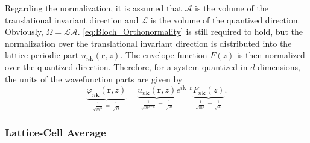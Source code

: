 Regarding the normalization, it is assumed that $\mathcal{A}$ is
the volume of the translational invariant direction and $\mathcal{L}$
is the volume of the quantized direction. Obviously, $\Omega=\mathcal{LA}$.
\ref{eq:Bloch_Orthonormality} is still required to hold, but the
normalization over the translational invariant direction is distributed
into the lattice periodic part $u_{n\mathbf{k}}(\mathbf{r},z)$. The
envelope function $F(z)$ is then normalized over the quantized direction.
Therefore, for a system quantized in $d$ dimensions, the units of
the wavefunction parts are given by\begin{equation}
\underbrace{\varphi_{n\mathbf{k}}(\mathbf{r},z)}_{\frac{1}{\sqrt{m^{3}}}=\frac{1}{\sqrt{\Omega}}}=\underbrace{u_{n\mathbf{k}}(\mathbf{r},z)}_{\frac{1}{\sqrt{m^{3-d}}}=\frac{1}{\sqrt{\mathcal{A}}}}e^{i\mathbf{k}\cdot\mathbf{r}}\underbrace{F_{n\mathbf{k}}(z)}_{\frac{1}{\sqrt{m^{d}}}=\frac{1}{\sqrt{\mathcal{L}}}}.\end{equation}



\subsubsection{Lattice-Cell Average}


